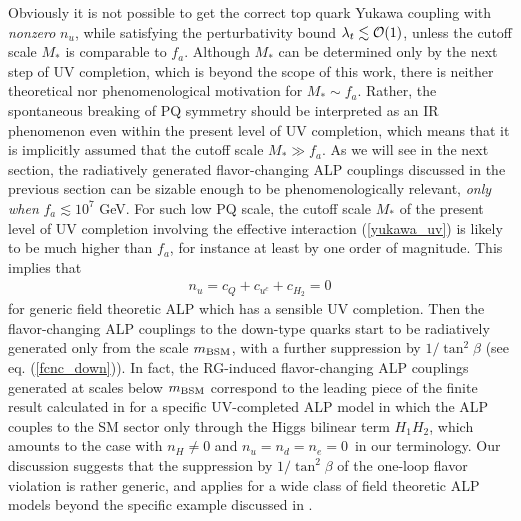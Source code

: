 \documentclass[preprint,prd,aps,tighten,nofootinbib,amssymb]{revtex4}
\newcommand{\bea}{\begin{eqnarray}}
\newcommand{\eea}{\end{eqnarray}}
\def\vpq{f_{a}}
\begin{document}
Obviously   it is not possible to get the correct top quark Yukawa coupling with {\it nonzero} $n_u$, while satisfying the perturbativity bound $\lambda_t \lesssim {\cal O}(1)$, unless the cutoff scale $M_*$ is comparable to $\vpq$. 
Although $M_*$ can be  determined only by the next step of UV completion, which is beyond the scope of this work, there is neither theoretical nor phenomenological motivation for $M_*\sim f_a$.
Rather, the spontaneous breaking of PQ symmetry should be interpreted as an IR phenomenon even within the present level of UV completion, which means that it is implicitly assumed that the cutoff scale $M_*\gg f_a$.
As we will see in the next section, the radiatively generated flavor-changing ALP couplings discussed in the previous section can be sizable enough to be phenomenologically relevant, {\it only when} $f_a\lesssim 10^7$ GeV. 
For such low PQ scale, the cutoff scale $M_*$ of the present level of UV completion involving the effective interaction (\ref{yukawa_uv}) is likely to be much higher than $f_a$,  for instance  at least by one order of magnitude.
This implies that
\bea
n_u=c_Q+c_{u^c}+c_{H_2}=0
\eea
for generic field theoretic ALP which has a sensible UV completion.
Then the flavor-changing ALP couplings to the down-type quarks  start to be radiatively generated only from the scale $m_{\rm BSM}$, with a further suppression by $1/\tan^2\beta$ (see eq. (\ref{fcnc_down})).
In fact, the RG-induced flavor-changing ALP couplings generated at scales below $m_{\rm BSM}$ correspond to the leading piece  of the finite result calculated in \cite{Freytsis:2009ct} for a specific UV-completed ALP model in which the ALP couples to the SM sector only through the Higgs bilinear term $H_1 H_2$,  which amounts to the case with $n_H \neq 0$ and $n_u=n_d =n_e=0\,$ in our terminology. 
Our discussion suggests  that the suppression by $1/\tan^2 \beta$  of the one-loop flavor violation is rather generic, and applies for a wide class of field theoretic ALP models beyond the specific example discussed in \cite{Freytsis:2009ct}.  
\end{document}
